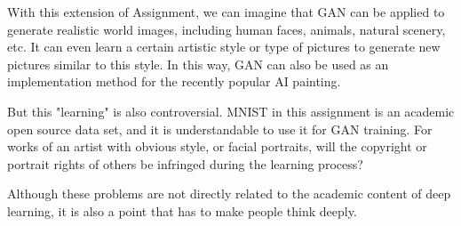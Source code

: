 With this extension of Assignment, we can imagine that GAN can be applied to generate realistic world images, including human faces, animals, natural scenery, etc.
It can even learn a certain artistic style or type of pictures to generate new pictures similar to this style.
In this way, GAN can also be used as an implementation method for the recently popular AI painting.

But this "learning" is also controversial.
MNIST in this assignment is an academic open source data set, and it is understandable to use it for GAN training.
For works of an artist with obvious style, or facial portraits, will the copyright or portrait rights of others be infringed during the learning process?

Although these problems are not directly related to the academic content of deep learning, it is also a point that has to make people think deeply.

